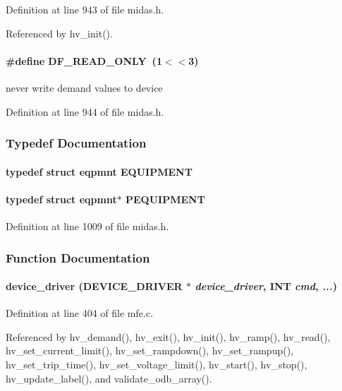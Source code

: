 Definition at line 943 of file midas.h.

Referenced by hv\_\-init().
\paragraph[{DF\_\-READ\_\-ONLY}]{\setlength{\rightskip}{0pt plus 5cm}\#define DF\_\-READ\_\-ONLY~(1$<$$<$3)}\hfill\label{group__mequipment_ga4dc67d22ff12f3b0e6daff496f870a7f}
never write demand values to device 

Definition at line 944 of file midas.h.

\subsubsection{Typedef Documentation}
\paragraph[{EQUIPMENT}]{\setlength{\rightskip}{0pt plus 5cm}typedef struct {\bf eqpmnt}  {\bf EQUIPMENT}}\hfill\label{group__mequipment_ga7607314ed24f38585cb42adcb60efd4e}
\paragraph[{PEQUIPMENT}]{\setlength{\rightskip}{0pt plus 5cm}typedef struct {\bf eqpmnt}$\ast$ {\bf PEQUIPMENT}}\hfill\label{group__mequipment_gac5b19f8245eb22101dcb9ca46d0d797d}


Definition at line 1009 of file midas.h.

\subsubsection{Function Documentation}
\paragraph[{device\_\-driver}]{ device\_\-driver ({\bf DEVICE\_\-DRIVER} $\ast$ {\em device\_\-driver}, \/  {\bf INT} {\em cmd}, \/   {\em ...})}\hfill\label{group__mequipment_gab0636870de45a7b8a7bcb625c0ac7582}


Definition at line 404 of file mfe.c.

Referenced by hv\_\-demand(), hv\_\-exit(), hv\_\-init(), hv\_\-ramp(), hv\_\-read(), hv\_\-set\_\-current\_\-limit(), hv\_\-set\_\-rampdown(), hv\_\-set\_\-rampup(), hv\_\-set\_\-trip\_\-time(), hv\_\-set\_\-voltage\_\-limit(), hv\_\-start(), hv\_\-stop(), hv\_\-update\_\-label(), and validate\_\-odb\_\-array().